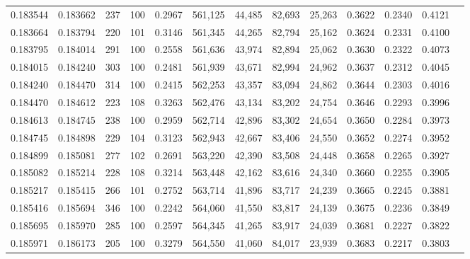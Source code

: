 \begin{tabular}{rrrrrrrrrrrrr}
0.183544 & 0.183662 &   237 & 100 &                                     0.2967 & 561,125 &  44,485 &  82,693 &  25,263 & 0.3622 & 0.2340 & 0.4121 \\
0.183664 & 0.183794 &   220 & 101 &                                     0.3146 & 561,345 &  44,265 &  82,794 &  25,162 & 0.3624 & 0.2331 & 0.4100 \\
0.183795 & 0.184014 &   291 & 100 &                                     0.2558 & 561,636 &  43,974 &  82,894 &  25,062 & 0.3630 & 0.2322 & 0.4073 \\
0.184015 & 0.184240 &   303 & 100 &                                     0.2481 & 561,939 &  43,671 &  82,994 &  24,962 & 0.3637 & 0.2312 & 0.4045 \\
0.184240 & 0.184470 &   314 & 100 &                                     0.2415 & 562,253 &  43,357 &  83,094 &  24,862 & 0.3644 & 0.2303 & 0.4016 \\
0.184470 & 0.184612 &   223 & 108 &                                     0.3263 & 562,476 &  43,134 &  83,202 &  24,754 & 0.3646 & 0.2293 & 0.3996 \\
0.184613 & 0.184745 &   238 & 100 &                                     0.2959 & 562,714 &  42,896 &  83,302 &  24,654 & 0.3650 & 0.2284 & 0.3973 \\
0.184745 & 0.184898 &   229 & 104 &                                     0.3123 & 562,943 &  42,667 &  83,406 &  24,550 & 0.3652 & 0.2274 & 0.3952 \\
0.184899 & 0.185081 &   277 & 102 &                                     0.2691 & 563,220 &  42,390 &  83,508 &  24,448 & 0.3658 & 0.2265 & 0.3927 \\
0.185082 & 0.185214 &   228 & 108 &                                     0.3214 & 563,448 &  42,162 &  83,616 &  24,340 & 0.3660 & 0.2255 & 0.3905 \\
0.185217 & 0.185415 &   266 & 101 &                                     0.2752 & 563,714 &  41,896 &  83,717 &  24,239 & 0.3665 & 0.2245 & 0.3881 \\
0.185416 & 0.185694 &   346 & 100 &                                     0.2242 & 564,060 &  41,550 &  83,817 &  24,139 & 0.3675 & 0.2236 & 0.3849 \\
0.185695 & 0.185970 &   285 & 100 &                                     0.2597 & 564,345 &  41,265 &  83,917 &  24,039 & 0.3681 & 0.2227 & 0.3822 \\
0.185971 & 0.186173 &   205 & 100 &                                     0.3279 & 564,550 &  41,060 &  84,017 &  23,939 & 0.3683 & 0.2217 & 0.3803 \\

\end{tabular}

